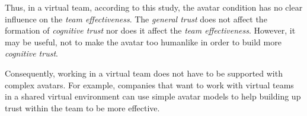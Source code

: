 \documentclass[sigchi]{acmart}
\begin{document}
Thus, in a virtual team, according to this study, the avatar condition has no clear influence on the \textit{team effectiveness}. The \textit{general trust} does not affect the formation of \textit{cognitive trust} nor does it affect the \textit{team effectiveness}. However, it may be useful, not to make the avatar too humanlike in order to build more \textit{cognitive trust}.

Consequently, working in a virtual team does not have to be supported with complex avatars. For example, companies that want to work with virtual teams in a shared virtual environment can use simple avatar models to help building up trust within the team to be more effective.





\appendix
\end{document}
